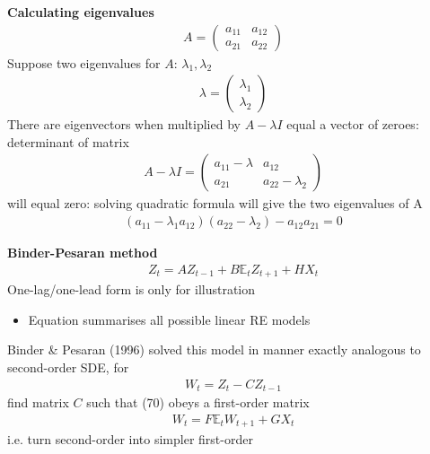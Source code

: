 \documentclass{beamer}
\begin{document}
\begin{frame}
  \textbf{Calculating eigenvalues}
  \begin{align}
    A = \begin{pmatrix}    a_{11} & a_{12} \\ a_{21} & a_{22}  \end{pmatrix}
  \end{align}
  Suppose two eigenvalues for $A$: $\lambda_1,\lambda_2$ 
\begin{align}
  \lambda = \begin{pmatrix}
    \lambda_1 \\ \lambda_2
  \end{pmatrix}
\end{align}
\medskip
There are eigenvectors when multiplied by $A-\lambda I$ equal a vector of zeroes: determinant of matrix 
\begin{align}
  A-\lambda I = \begin{pmatrix}
    a_{11}-\lambda & a_{12} \\ a_{21} & a_{22}-\lambda_2
  \end{pmatrix}
\end{align}
\medskip
will equal zero: solving quadratic formula will give the two eigenvalues of A
\begin{align}
  (a_{11}-\lambda_1 a_{12})(a_{22}-\lambda_2)-a_{12}a_{21}=0
\end{align}
\end{frame}

\begin{frame}
  \textbf{Binder-Pesaran method}  
  \begin{align}  
      Z_t=AZ_{t-1} + B\mathbb{E}_t Z_{t+1} + HX_t 
  \end{align}
  \medskip
  One-lag/one-lead form is only for illustration
  \begin{itemize}
    \item Equation summarises all possible linear RE models
  \end{itemize}
  \medskip
  Binder \& Pesaran (1996) solved this model in manner exactly analogous to second-order SDE, for
  \begin{align}
      W_t=Z_t - CZ_{t-1}  
   \end{align} 
   \medskip
   find matrix $C$ such that (70) obeys a first-order matrix 
   \begin{align}
      W_t=F\mathbb{E}_t W_{t+1} + GX_t  
  \end{align}
  \medskip
  i.e. turn second-order into simpler first-order 
\end{frame}
\end{document}
